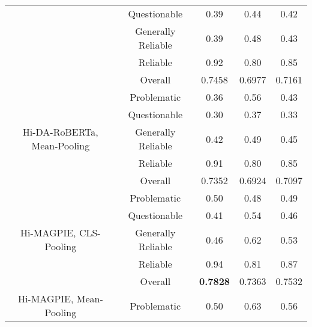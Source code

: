 \begin{table}[htbp]
\begin{longtable}{| c | c | c | c | c |}
                                                          & Questionable       & 0.39               & 0.44            & 0.42            \\
                                                          & Generally Reliable & 0.39               & 0.48            & 0.43            \\
                                                          & Reliable           & 0.92               & 0.80            & 0.85            \\\cline{2-5}
                                                          & Overall            & 0.7458             & 0.6977          & 0.7161          \\
        \hline
        \multirow{5}{*}{Hi-DA-RoBERTa, Mean-Pooling}      & Problematic        & 0.36               & 0.56            & 0.43            \\
                                                          & Questionable       & 0.30               & 0.37            & 0.33            \\
                                                          & Generally Reliable & 0.42               & 0.49            & 0.45            \\
                                                          & Reliable           & 0.91               & 0.80            & 0.85            \\\cline{2-5}
                                                          & Overall            & 0.7352             & 0.6924          & 0.7097          \\
        \hline
        \multirow{5}{*}{Hi-MAGPIE, CLS-Pooling}           & Problematic        & 0.50               & 0.48            & 0.49            \\
                                                          & Questionable       & 0.41               & 0.54            & 0.46            \\
                                                          & Generally Reliable & 0.46               & 0.62            & 0.53            \\
                                                          & Reliable           & 0.94               & 0.81            & 0.87            \\\cline{2-5}
                                                          & Overall            & \textbf{0.7828}    & 0.7363          & 0.7532          \\
        \hline
        \multirow{5}{*}{Hi-MAGPIE, Mean-Pooling}          & Problematic        & 0.50               & 0.63            & 0.56            \\

\end{longtable}
\end{table}
